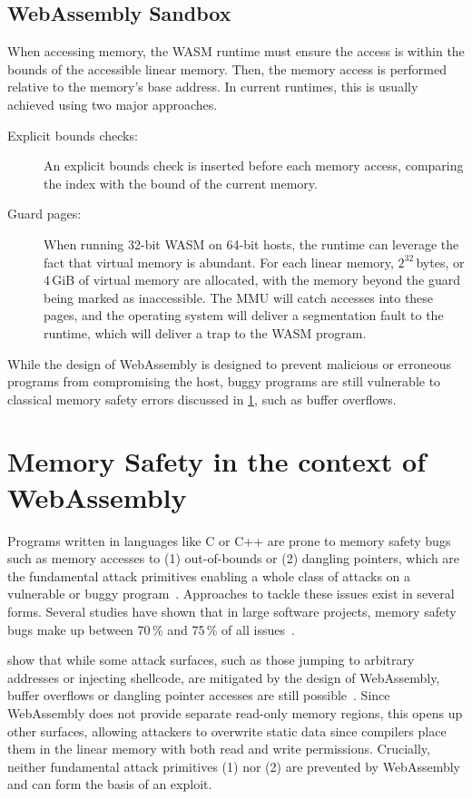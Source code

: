 \subsection{WebAssembly Sandbox}
\label{subsec:webassembly-sandbox}
When accessing memory, the \ac{WASM} runtime must ensure the access is within the bounds of the accessible linear memory.
Then, the memory access is performed relative to the memory's base address.
In current runtimes, this is usually achieved using two major approaches.
\begin{description}
    \item[Explicit bounds checks:] An explicit bounds check is inserted before each memory access, comparing the index with the bound of the current memory.
    \item[Guard pages:] When running 32-bit \ac{WASM} on 64-bit hosts, the runtime can leverage the fact that virtual memory is abundant.
    For each linear memory, $2^{32}$\,bytes, or 4\,GiB of virtual memory are allocated, with the memory beyond the guard being marked as inaccessible.
    The \ac{MMU} will catch accesses into these pages, and the operating system will deliver a segmentation fault to the runtime, which will deliver a trap to the \ac{WASM} program.
\end{description}


While the design of WebAssembly is designed to prevent malicious or erroneous programs from compromising the host, buggy programs are still vulnerable to classical memory safety errors discussed in \cref{sec:memory-safety-wasm}, such as buffer overflows.


\section{Memory Safety in the context of WebAssembly}
\label{sec:memory-safety-wasm}

Programs written in languages like C or C++ are prone to memory safety bugs such as memory accesses to (1) out-of-bounds or (2) dangling pointers, which are the fundamental attack primitives enabling a whole class of attacks on a vulnerable or buggy program~\cite{szekeres2013sok}.
Approaches to tackle these issues exist in several forms.
Several studies have shown that in large software projects, memory safety bugs make up between 70\,\% and 75\,\% of all issues~\cite{chromium_memory_safety,microsoft_memory_safety,android_memory_safety}.

\citeauthor*{lehmann2020everything} show that while some attack surfaces, such as those jumping to arbitrary addresses or injecting shellcode, are mitigated by the design of WebAssembly, buffer overflows or dangling pointer accesses are still possible~\cite{lehmann2020everything}.
Since WebAssembly does not provide separate read-only memory regions, this opens up other surfaces, allowing attackers to overwrite static data since compilers place them in the linear memory with both read and write permissions.
Crucially, neither fundamental attack primitives (1) nor (2) are prevented by WebAssembly and can form the basis of an exploit.

